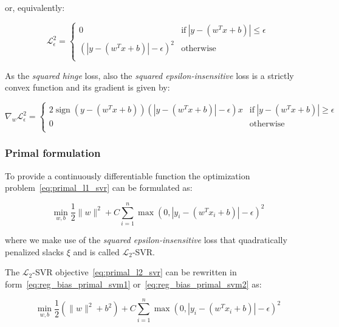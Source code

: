or, equivalently:

\begin{equation} \label{eq:squared_eps_loss2}
	\mathcal{L}_\epsilon^2 = 
	\begin{cases}
		0 & \text{if} \ |y - (w^T x + b)| \leq \epsilon \\
		(|y - (w^T x + b)| - \epsilon)^2 & \text{otherwise} \\
	\end{cases}
\end{equation}

As the \emph{squared hinge} loss, also the \emph{squared epsilon-insensitive} loss is a strictly convex function and its gradient is given by:


\begin{equation} \label{eq:squared_eps_loss_der}
	\nabla_w \mathcal{L}_\epsilon^2=
		\begin{cases}
            \displaystyle 2 \operatorname{sign}(y - (w^T x + b)) (|y - (w^T x + b)| - \epsilon) x & \text{if} \ |y - (w^T x + b)| \geq \epsilon \\
            0 & \text{otherwise} \\ 
        \end{cases}
\end{equation}

\subsubsection{Primal formulation}

To provide a continuously differentiable function the optimization problem~\eqref{eq:primal_l1_svr} can be formulated as:

\begin{equation} \label{eq:primal_l2_svr}
    \min_{w,b} \frac{1}{2} \| w \|^2 + C \sum_{i=1}^n \max(0, |y_i - (w^T x_i + b)| - \epsilon)^2
\end{equation}

where we make use of the \emph{squared epsilon-insensitive} loss that quadratically penalized slacks $\xi$ and is called $\mathcal{L}_2$-SVR.

The $\mathcal{L}_2$-SVR objective~\eqref{eq:primal_l2_svr} can be rewritten in form~\eqref{eq:reg_bias_primal_svm1} or~\eqref{eq:reg_bias_primal_svm2} as:

\begin{equation} \label{eq:reg_bias_primal_l2_svr}
	\min_{w,b} \frac{1}{2} (\| w \|^2 + b^2) + C \sum_{i=1}^n \max(0, |y_i - (w^T x_i + b)| - \epsilon)^2
\end{equation}

